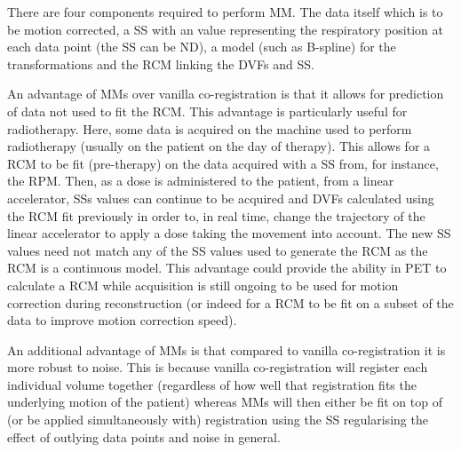             There are four components required to perform \gls{MM}. The data itself which is to be motion corrected, a \gls{SS} with an value representing the respiratory position at each data point (the \gls{SS} can be \gls{ND}), a model (such as B-spline) for the transformations and the \gls{RCM} linking the \glspl{DVF} and \gls{SS}.
            
            An advantage of \glspl{MM} over vanilla co-registration is that it allows for prediction of data not used to fit the \gls{RCM}. This advantage is particularly useful for radiotherapy. Here, some data is acquired on the machine used to perform radiotherapy (usually on the patient on the day of therapy). This allows for a \gls{RCM} to be fit (pre-therapy) on the data acquired with a \gls{SS} from, for instance, the \gls{RPM}. Then, as a dose is administered to the patient, from a linear accelerator, \glspl{SS} values can continue to be acquired and \glspl{DVF} calculated using the \gls{RCM} fit previously in order to, in real time, change the trajectory of the linear accelerator to apply a dose taking the movement into account. The new \gls{SS} values need not match any of the \gls{SS} values used to generate the \gls{RCM} as the \gls{RCM} is a continuous model. This advantage could provide the ability in \gls{PET} to calculate a \gls{RCM} while acquisition is still ongoing to be used for motion correction during reconstruction (or indeed for a \gls{RCM} to be fit on a subset of the data to improve motion correction speed).
            
            An additional advantage of \glspl{MM} is that compared to vanilla co-registration it is more robust to noise. This is because vanilla co-registration will register each individual volume together (regardless of how well that registration fits the underlying motion of the patient) whereas \glspl{MM} will then either be fit on top of (or be applied simultaneously with) registration using the \gls{SS} regularising the effect of outlying data points and noise in general.
            

